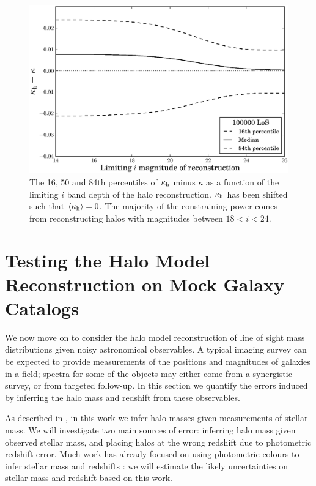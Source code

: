 \documentclass[useAMS,usenatbib]{mn2e}
\begin{document}
\begin{figure}
\includegraphics[width=\columnwidth]{figs/mag_scatter.eps}
\caption[magcut]{The 16, 50 and 84th percentiles of $\kappa_{\rm h}$ minus
$\kappa$ as a function of the limiting $i$ band depth of the halo
reconstruction. $\kappa_{\rm h}$ has been shifted such that
$\left\langle\kappa_{\rm h}\right\rangle=0$. The majority of the constraining power
comes from reconstructing halos with magnitudes between $18<i<24$.}
\label{fig:magcut}
\end{figure}



\section{Testing the Halo Model Reconstruction on Mock Galaxy Catalogs}
\label{sec:obsMstar+z}

We now move on to consider the halo model reconstruction of line of sight mass
distributions given noisy astronomical observables. A typical imaging survey
can be expected to provide measurements of the positions and magnitudes of
galaxies in a field;  spectra for some of the objects may either come from a
synergistic survey, or from targeted follow-up. In this section we quantify
the errors induced by inferring the halo mass and redshift from these
observables. 

As described in , in this work we infer halo masses
given measurements of stellar mass. We will investigate two main sources of
error: inferring halo mass given observed stellar mass, and placing halos at
the wrong redshift due to photometric redshift error. Much work has already
focused on using photometric colours to infer stellar mass
\citep[\eg][]{AugerEtal2009} and redshifts \citep[\eg][]{BPZ}: we will
estimate the likely uncertainties on stellar mass and redshift based on this
work.  
\end{document}
